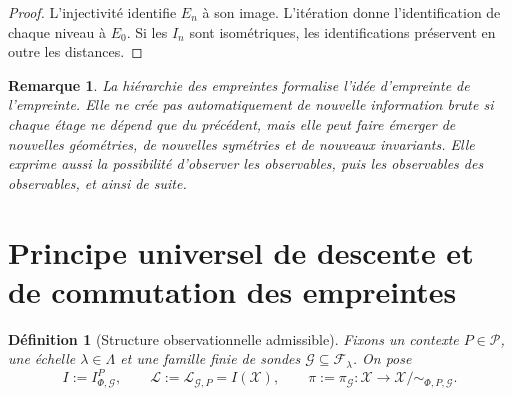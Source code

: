 \documentclass[11pt,a4paper]{article}
\newtheorem{definition}{Définition}
\newtheorem{remark}{Remarque}
\begin{document}
\begin{appendices}
\begin{proof}
L'injectivité identifie \(E_n\) à son image. L'itération donne l'identification de chaque niveau à \(E_0\). Si les \(I_n\) sont isométriques, les identifications préservent en outre les distances.
\end{proof}

\begin{remark}
La hiérarchie des empreintes formalise l'idée d'empreinte de l'empreinte. Elle ne crée pas automatiquement de nouvelle information brute si chaque étage ne dépend que du précédent, mais elle peut faire émerger de nouvelles géométries, de nouvelles symétries et de nouveaux invariants. Elle exprime aussi la possibilité d'observer les observables, puis les observables des observables, et ainsi de suite.
\end{remark}
















\section{Principe universel de descente et de commutation des empreintes}

\begin{definition}[Structure observationnelle admissible]
Fixons un contexte \(P\in\mathcal P\), une échelle \(\lambda\in\Lambda\) et une famille finie de sondes \(\mathcal G\subseteq\mathcal F_\lambda\).
On pose
\[
I:=I_{\Phi,\mathcal G}^P,\qquad
\mathcal L:=\mathcal L_{\mathcal G,P}=I(\mathcal X),\qquad
\pi:=\pi_{\mathcal G}:\mathcal X\to\mathcal X/{\sim_{\Phi,P,\mathcal G}}.
\]


\end{definition}
\end{appendices}
\end{document}
